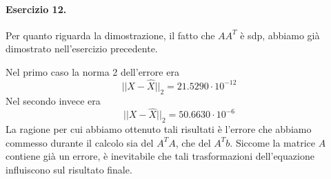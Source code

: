 \paragraph{Esercizio 12.} Per quanto riguarda la dimostrazione, il fatto che $AA^T$ è sdp, abbiamo già dimostrato nell'esercizio precedente.

Nel primo caso la norma 2 dell'errore era \[||X - \hat{X}||_2 = 21.5290 \cdot 10^{-12}\] Nel secondo invece era \[||X - \hat{X}||_2 = 50.6630 \cdot 10^{-6}\]La ragione per cui abbiamo ottenuto tali risultati è l'errore che abbiamo commesso durante il calcolo sia del $A^TA$, che del $A^Tb$. Siccome la matrice $A$ contiene già un errore, è inevitabile che tali trasformazioni dell'equazione influiscono sul risultato finale.